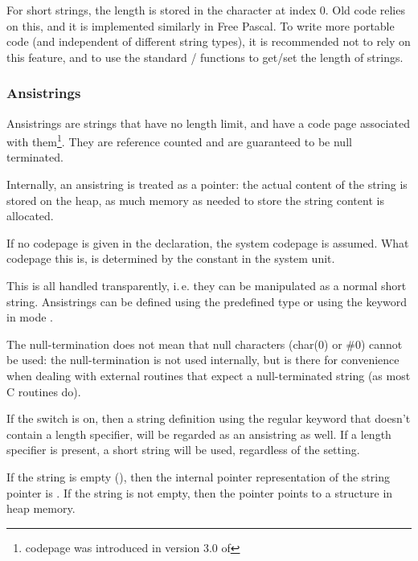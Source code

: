 For short strings, the length is stored in the character at index 0. Old
\tp code relies on this, and it is implemented similarly in Free Pascal.
To write more portable code (and independent of different string types),
it is recommended not to rely on this feature, and to use the standard
/ functions to get/set the length of strings.

\subsubsection{Ansistrings}
Ansistrings are strings that have no length limit, and have a code page associated with
them\footnote{codepage was introduced in version 3.0 of \fpc}.
They are reference counted and are guaranteed to be null terminated.

Internally, an ansistring is treated as a pointer: the actual content of the string is stored on the heap, as much
memory as needed to store the string content is allocated.

If no codepage is given in the declaration, the system codepage is assumed.
What codepage this is, is determined by the  constant in the system unit.

This is all handled transparently, i.\,e. they can be manipulated as a normal
short string. Ansistrings can be defined using the predefined 
type or using the  keyword in mode .

\begin{remark}
The null-termination does not mean that null characters (char(0) or \#0)
cannot be used: the null-termination is not used internally, but is there for
convenience when dealing with external routines that expect a
null-terminated string (as most C routines do).
\end{remark}

If the  switch is on, then a string definition using the
regular  keyword that doesn't contain a length specifier,
will be regarded as an ansistring as well. If a length specifier is present,
a short string will be used, regardless of the  setting.

If the string is empty (), then the internal pointer representation
of the string pointer is . If the string is not empty, then the
pointer points to a structure in heap memory.

